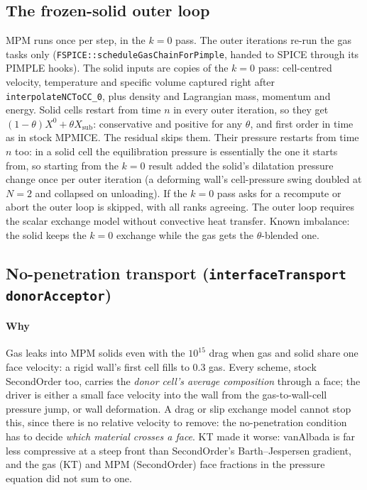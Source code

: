 \documentclass[11pt]{article}
\newcommand{\code}[1]{\texttt{\small #1}}
\begin{document}
\subsection{The frozen-solid outer loop}

MPM runs once per step, in the $k=0$ pass. The outer iterations re-run the gas tasks only
(\code{FSPICE::scheduleGasChainForPimple}, handed to SPICE through its PIMPLE hooks). The
solid inputs are copies of the $k=0$ pass: cell-centred velocity, temperature and specific
volume captured right after \code{interpolateNCToCC\_0}, plus density and Lagrangian mass,
momentum and energy. Solid cells restart from time $n$ in every outer iteration, so they get
$(1-\theta)X^0 + \theta X_\text{sub}$: conservative and positive for any $\theta$, and first
order in time as in stock MPMICE. The residual skips them. Their pressure restarts from time
$n$ too: in a solid cell the equilibration pressure is essentially the one it starts from, so
starting from the $k=0$ result added the solid's dilatation pressure change once per outer
iteration (a deforming wall's cell-pressure swing doubled at $N=2$ and collapsed on
unloading). If the $k=0$ pass asks for a recompute or abort the outer loop is skipped, with
all ranks agreeing. The outer loop requires the scalar exchange model without convective heat
transfer. Known imbalance: the solid keeps the $k=0$ exchange while the gas gets the
$\theta$-blended one.

\subsection{No-penetration transport (\code{interfaceTransport donorAcceptor})}

\paragraph{Why}
Gas leaks into MPM solids even with the $10^{15}$ drag when gas and solid share one face
velocity: a rigid wall's first cell fills to 0.3 gas. Every scheme, stock SecondOrder too,
carries the \emph{donor cell's average composition} through a face; the driver is either a
small face velocity into the wall from the gas-to-wall-cell pressure jump, or wall
deformation. A drag or slip exchange model cannot stop this, since there is no relative
velocity to remove: the no-penetration condition has to decide \emph{which material crosses a
face}. KT made it worse: vanAlbada is far less compressive at a steep front than SecondOrder's
Barth--Jespersen gradient, and the gas (KT) and MPM (SecondOrder) face fractions in the
pressure equation did not sum to one.
\end{document}
